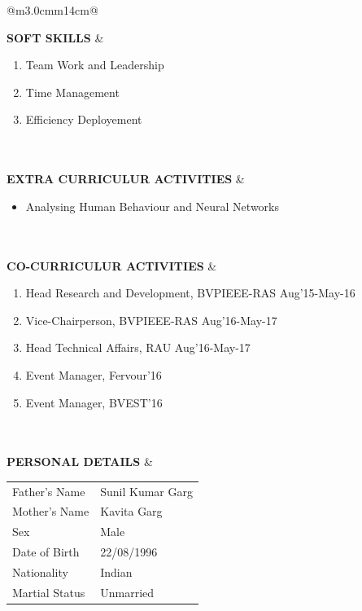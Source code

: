 \documentclass[a4paper]{article}
\begin{document}
\begin{longtable}{@{}m{3.0cm}m{14cm}@{}}
			
			\textrm{\textbf {SOFT SKILLS}} & 
				\begin{enumerate}
					\itemsep -2pt
					\item
					Team Work and Leadership
					\item
					Time Management
					\item
					Efficiency Deployement
				\end{enumerate}
			\\ \\
			
			
			\textrm{\textbf {EXTRA \newline CURRICULUR ACTIVITIES}} & 
				\begin{itemize}
					\itemsep -2pt
					\item
					Analysing Human Behaviour and Neural Networks
				\end{itemize}
			\\ \\
			
			
			\textrm{\textbf {CO-CURRICULUR ACTIVITIES}} & 
				\begin{enumerate}
					\itemsep -2pt
					\item
					Head Research and Development, BVPIEEE-RAS \hfill Aug'15-May-16
					\item
					Vice-Chairperson, BVPIEEE-RAS \hfill Aug'16-May-17
					\item
					Head Technical Affairs, RAU \hfill Aug'16-May-17
					\item
					Event Manager, Fervour'16
					\item
					Event Manager, BVEST'16
				\end{enumerate}
			\\ \\
			
			\textrm{\textbf {PERSONAL DETAILS}} & 
				
					\begin{tabular}{ m{4cm}m{4cm}}
						Father's Name & Sunil Kumar Garg \\
						Mother's Name & Kavita Garg \\
						Sex & Male \\
						Date of Birth & 22/08/1996 \\
						Nationality & Indian \\
						Martial Status & Unmarried \\
  					\end{tabular}
				

\end{longtable}
\end{document}
